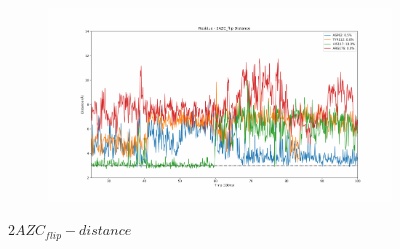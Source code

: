 \documentclass[fleqn,10pt]{wlscirep}
\begin{document}
\begin{figure}[!ht]
\begin{subfigure}{.45\textwidth}
  \end{subfigure}
    \begin{subfigure}{.45\textwidth}
     \centering
     \includegraphics[width=.95\linewidth]{2AZC_flip/2AZC_flip-dist_4.pdf}
  \end{subfigure}
\caption{$2AZC_{flip}-distance$}
\label{sup:2AZC_flip-dist}
\end{figure}  
\end{document}
